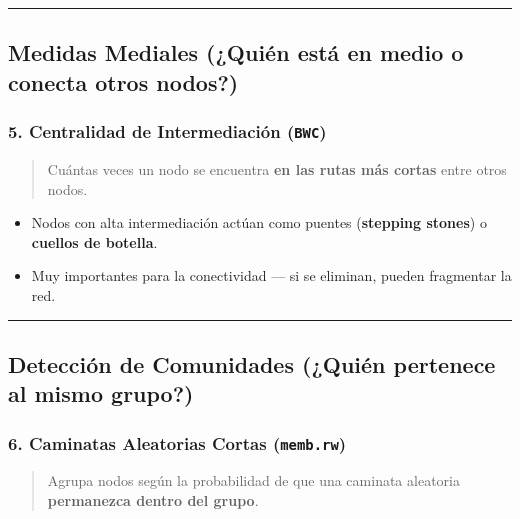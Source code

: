\documentclass[
]{book}
\providecommand{\tightlist}{%
  \setlength{\itemsep}{0pt}\setlength{\parskip}{0pt}}
\begin{document}
\begin{center}\rule{0.5\linewidth}{0.5pt}\end{center}

\subsection{Medidas Mediales (¿Quién está en medio o conecta otros nodos?)}\label{medidas-mediales-quiuxe9n-estuxe1-en-medio-o-conecta-otros-nodos}

\subsubsection{\texorpdfstring{5. Centralidad de Intermediación (\texttt{BWC})}{5. Centralidad de Intermediación (BWC)}}\label{centralidad-de-intermediaciuxf3n-bwc}

\begin{quote}
Cuántas veces un nodo se encuentra \textbf{en las rutas más cortas} entre otros nodos.
\end{quote}

\begin{itemize}
\tightlist
\item
  Nodos con alta intermediación actúan como puentes (\textbf{stepping stones}) o \textbf{cuellos de botella}.
\item
  Muy importantes para la conectividad --- si se eliminan, pueden fragmentar la red.
\end{itemize}

\begin{center}\rule{0.5\linewidth}{0.5pt}\end{center}

\subsection{Detección de Comunidades (¿Quién pertenece al mismo grupo?)}\label{detecciuxf3n-de-comunidades-quiuxe9n-pertenece-al-mismo-grupo}

\subsubsection{\texorpdfstring{6. Caminatas Aleatorias Cortas (\texttt{memb.rw})}{6. Caminatas Aleatorias Cortas (memb.rw)}}\label{caminatas-aleatorias-cortas-memb.rw}

\begin{quote}
Agrupa nodos según la probabilidad de que una caminata aleatoria \textbf{permanezca dentro del grupo}.
\end{quote}
\end{document}
